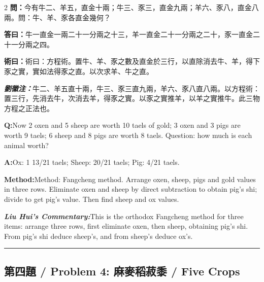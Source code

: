 \documentclass[11pt,a4paper]{article}
\newcommand{\cnwen}{\textcolor{cnlabelfg}{\textbf{問：}}}
\newcommand{\cnda}{\textbf{答曰：}}
\newcommand{\cnshu}{\textcolor{cnlabelfg}{\textbf{術曰：}}}
\newcommand{\cnzhu}{\textcolor{commentarycolor}{\textit{\textbf{劉徽注：}}}}
\newcommand{\enwen}{\textcolor{enlabelfg}{\textbf{Q:}}}
\newcommand{\enda}{\textcolor{enlabelfg}{\textbf{A:}}}
\newcommand{\enshu}{\textcolor{enlabelfg}{\textbf{Method:}}}
\newcommand{\enzhu}{\textcolor{enlabelfg}{\textit{\textbf{Liu Hui's Commentary:}}}}
\begin{document}
\begin{paracol}{2}
\switchcolumn[0]
\cnwen 今有牛二、羊五，直金十兩；牛三、豕三，直金九兩；羊六、豕八，直金八兩。問：牛、羊、豕各直金幾何？

\cnda 牛一直金一兩二十一分兩之十三，羊一直金二十一分兩之二十，豕一直金二十一分兩之四。

\cnshu 術曰：方程術。置牛、羊、豕之數及直金於三行，以直除消去牛、羊，得下豕之實，實如法得豕之直。以次求羊、牛之直。

\cnzhu 牛二、羊五直十兩，牛三、豕三直九兩，羊六、豕八直八兩。以方程術：置三行，先消去牛，次消去羊，得豕之實。以豕之實推羊，以羊之實推牛。此三物方程之正法也。

\switchcolumn[1]
\enwen Now 2 oxen and 5 sheep are worth 10 taels of gold; 3 oxen and 3 pigs are worth 9 taels; 6 sheep and 8 pigs are worth 8 taels. Question: how much is each animal worth?

\enda Ox: 1 13/21 taels; Sheep: 20/21 taels; Pig: 4/21 taels.

\enshu Method: Fangcheng method. Arrange oxen, sheep, pigs and gold values in three rows. Eliminate oxen and sheep by direct subtraction to obtain pig's shi; divide to get pig's value. Then find sheep and ox values.

\enzhu This is the orthodox Fangcheng method for three items: arrange three rows, first eliminate oxen, then sheep, obtaining pig's shi. From pig's shi deduce sheep's, and from sheep's deduce ox's.
\end{paracol}

\bigskip\hrule\bigskip

\subsection{第四題 / Problem 4: 麻麥稻菽黍 / Five Crops}
\end{document}
